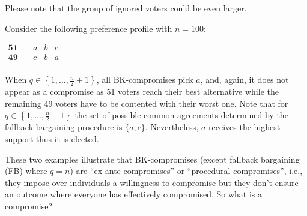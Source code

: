 \documentclass[version=3.21, pagesize, notitlepage, twoside=off, bibliography=totoc, DIV=calc, fontsize=12pt, a4paper]{scrartcl}
\begin{document}
Please note that the group of ignored voters could be even larger.
\begin{example}
	Consider the following preference profile with $n=100$:
	\begin{center}
		$
		\begin{array}{cccc}
		\mathbf{51} \quad &a&b&c\\
		\mathbf{49} \quad &c&b&a\\
		\end{array}
		$
	\end{center}
	When $q\in \left\{ 1,..., \frac{n}{2} +1\right\} $, all BK-compromises pick $a$, and, again, it does not appear as a compromise as 51 voters reach their best alternative while the remaining 49 voters have to be contented with their worst one. Note that for $q\in \left\{ 1,..., \frac{n}{2} -1 \right\} $ the set of possible common agreements determined by the fallback bargaining procedure is $\{a,c\}$. Nevertheless, $a$ receives the highest support thus it is elected.
\end{example}

These two examples illustrate that BK-compromises (except fallback bargaining (FB) where $q=n$) are “ex-ante compromises” or “procedural compromises”, i.e., they impose over individuals a willingness to compromise but they don't ensure an outcome where everyone has effectively compromised. So what is a compromise?

\end{document}
